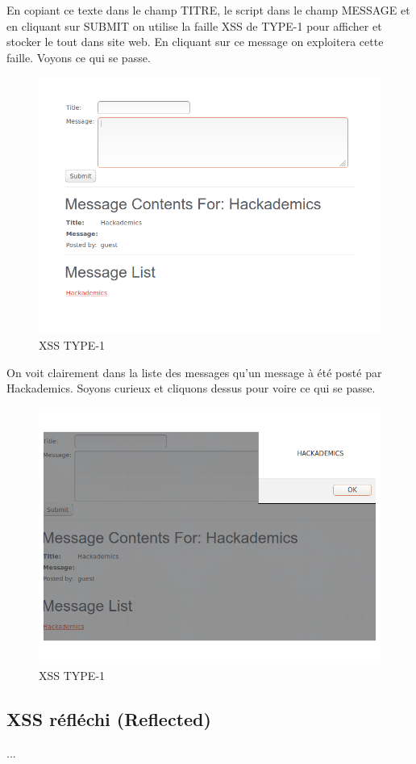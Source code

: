 \begin{flushleft}
En copiant ce texte dans le champ TITRE, le script dans le champ MESSAGE et  en cliquant sur SUBMIT on utilise la faille XSS de TYPE-1 pour afficher et stocker le tout dans site web. En cliquant sur ce message on exploitera cette faille. Voyons ce qui se passe.
\end{flushleft}

\begin{figure}[hbtp]
\caption{XSS TYPE-1}
\centering
\includegraphics[scale=0.3]{Web/assets/xsst1-1.png}
\end{figure}

\bigskip

\begin{flushleft}
On voit clairement dans la liste des messages qu'un message à été posté par Hackademics. Soyons curieux et cliquons dessus pour voire ce qui se passe.
\end{flushleft}

\bigskip

\begin{figure}[hbtp]
\caption{XSS TYPE-1}
\centering
\includegraphics[scale=0.3]{Web/assets/xsst1-2.png}
\end{figure}

\subsection{XSS réfléchi (Reflected)}\label{vulnerabilites:web:xss:reflected}

...

\endinput
